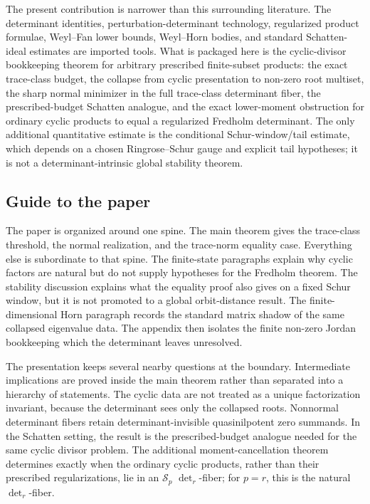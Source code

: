 The present contribution is narrower than this surrounding literature.  The
determinant identities, perturbation-determinant technology, regularized
product formulae, Weyl--Fan lower bounds, Weyl--Horn bodies, and standard
Schatten-ideal estimates are imported tools.  What is packaged here is the
cyclic-divisor bookkeeping theorem for arbitrary prescribed finite-subset
products: the exact trace-class budget, the collapse from cyclic presentation
to non-zero root multiset, the sharp normal minimizer in the full trace-class
determinant fiber, the prescribed-budget Schatten analogue, and the exact
lower-moment obstruction for ordinary cyclic products to equal a regularized
Fredholm determinant.  The only additional quantitative estimate is the
conditional Schur-window/tail estimate, which depends on a chosen
Ringrose--Schur gauge and explicit tail hypotheses; it is not a
determinant-intrinsic global stability theorem.

\subsection{Guide to the paper}

The paper is organized around one spine.  The main theorem gives the
trace-class threshold, the normal realization, and the trace-norm equality
case.  Everything else is subordinate to that spine.  The finite-state
paragraphs explain why cyclic factors are natural but do not supply hypotheses
for the Fredholm theorem.  The stability discussion explains what the equality
proof also gives on a fixed Schur window, but it is not promoted to a global
orbit-distance result.  The finite-dimensional Horn paragraph records the
standard matrix shadow of the same collapsed eigenvalue data.  The appendix
then isolates the finite non-zero Jordan bookkeeping which the determinant
leaves unresolved.

The presentation keeps several nearby questions at the boundary.  Intermediate
implications are proved inside the main theorem rather than separated into a
hierarchy of statements.  The cyclic data are not treated as a unique
factorization invariant, because the determinant sees only the collapsed roots.
Nonnormal determinant fibers retain determinant-invisible quasinilpotent zero
summands.  In the Schatten setting, the result is the prescribed-budget
analogue needed for the same cyclic divisor problem.  The additional
moment-cancellation theorem determines exactly when the ordinary cyclic
products, rather than their prescribed regularizations, lie in an
\(\mathcal S_p\) \(\det_r\)-fiber; for \(p=r\), this is the natural
\(\det_r\)-fiber.

